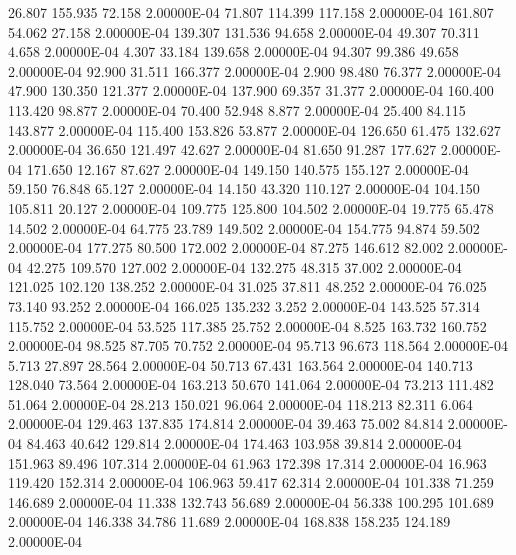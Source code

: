     26.807   155.935    72.158  2.00000E-04
    71.807   114.399   117.158  2.00000E-04
   161.807    54.062    27.158  2.00000E-04
   139.307   131.536    94.658  2.00000E-04
    49.307    70.311     4.658  2.00000E-04
     4.307    33.184   139.658  2.00000E-04
    94.307    99.386    49.658  2.00000E-04
    92.900    31.511   166.377  2.00000E-04
     2.900    98.480    76.377  2.00000E-04
    47.900   130.350   121.377  2.00000E-04
   137.900    69.357    31.377  2.00000E-04
   160.400   113.420    98.877  2.00000E-04
    70.400    52.948     8.877  2.00000E-04
    25.400    84.115   143.877  2.00000E-04
   115.400   153.826    53.877  2.00000E-04
   126.650    61.475   132.627  2.00000E-04
    36.650   121.497    42.627  2.00000E-04
    81.650    91.287   177.627  2.00000E-04
   171.650    12.167    87.627  2.00000E-04
   149.150   140.575   155.127  2.00000E-04
    59.150    76.848    65.127  2.00000E-04
    14.150    43.320   110.127  2.00000E-04
   104.150   105.811    20.127  2.00000E-04
   109.775   125.800   104.502  2.00000E-04
    19.775    65.478    14.502  2.00000E-04
    64.775    23.789   149.502  2.00000E-04
   154.775    94.874    59.502  2.00000E-04
   177.275    80.500   172.002  2.00000E-04
    87.275   146.612    82.002  2.00000E-04
    42.275   109.570   127.002  2.00000E-04
   132.275    48.315    37.002  2.00000E-04
   121.025   102.120   138.252  2.00000E-04
    31.025    37.811    48.252  2.00000E-04
    76.025    73.140    93.252  2.00000E-04
   166.025   135.232     3.252  2.00000E-04
   143.525    57.314   115.752  2.00000E-04
    53.525   117.385    25.752  2.00000E-04
     8.525   163.732   160.752  2.00000E-04
    98.525    87.705    70.752  2.00000E-04
    95.713    96.673   118.564  2.00000E-04
     5.713    27.897    28.564  2.00000E-04
    50.713    67.431   163.564  2.00000E-04
   140.713   128.040    73.564  2.00000E-04
   163.213    50.670   141.064  2.00000E-04
    73.213   111.482    51.064  2.00000E-04
    28.213   150.021    96.064  2.00000E-04
   118.213    82.311     6.064  2.00000E-04
   129.463   137.835   174.814  2.00000E-04
    39.463    75.002    84.814  2.00000E-04
    84.463    40.642   129.814  2.00000E-04
   174.463   103.958    39.814  2.00000E-04
   151.963    89.496   107.314  2.00000E-04
    61.963   172.398    17.314  2.00000E-04
    16.963   119.420   152.314  2.00000E-04
   106.963    59.417    62.314  2.00000E-04
   101.338    71.259   146.689  2.00000E-04
    11.338   132.743    56.689  2.00000E-04
    56.338   100.295   101.689  2.00000E-04
   146.338    34.786    11.689  2.00000E-04
   168.838   158.235   124.189  2.00000E-04
